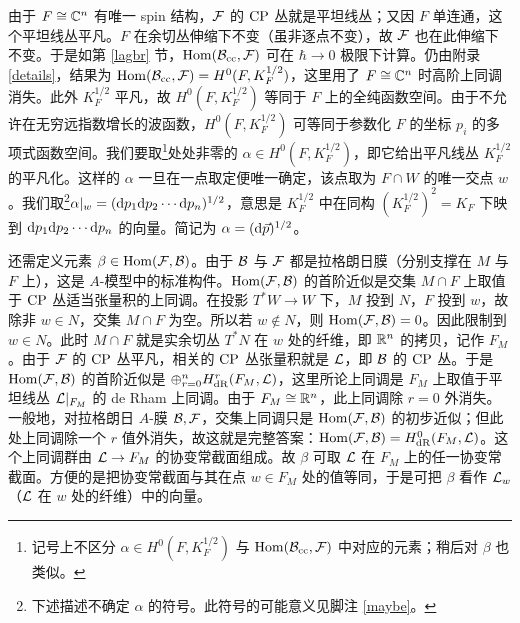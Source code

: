 由于 $F\cong{\mathbb C}^n$ 有唯一 spin 结构，${\mathcal F}$ 的 ${\mathrm{CP}}$ 丛就是平坦线丛；又因 $F$ 单连通，这个平坦线丛平凡。$F$ 在余切丛伸缩下不变（虽非逐点不变），故 ${\mathcal F}$ 也在此伸缩下不变。于是如第 \ref{lagbr} 节，${\mathrm{Hom}}({\mathcal B}_{\mathrm{cc}},{\mathcal F})$ 可在 $\hbar\to0$ 极限下计算。仍由附录 \ref{details}，结果为 ${\mathrm{Hom}}({\mathcal B}_{\mathrm{cc}},{\mathcal F})=H^0(F,K_F^{1/2})$，这里用了 $F\cong{\mathbb C}^n$ 时高阶上同调消失。此外 $K_F^{1/2}$ 平凡，故 $H^0(F,K_F^{1/2})$ 等同于 $F$ 上的全纯函数空间。由于不允许在无穷远指数增长的波函数，$H^0(F,K_F^{1/2})$ 可等同于参数化 $F$ 的坐标 $p_i$ 的多项式函数空间。我们要取\footnote{记号上不区分 $\alpha\in H^0(F,K_F^{1/2})$ 与 ${\mathrm{Hom}}({\mathcal B}_{\mathrm{cc}},{\mathcal F})$ 中对应的元素；稍后对 $\beta$ 也类似。}处处非零的 $\alpha\in H^0(F,K_F^{1/2})$，即它给出平凡线丛 $K_F^{1/2}$ 的平凡化。这样的 $\alpha$ 一旦在一点取定便唯一确定，该点取为 $F\cap W$ 的唯一交点 $w$。我们取\footnote{\label{funnysign}下述描述不确定 $\alpha$ 的符号。此符号的可能意义见脚注 \ref{maybe}。}$\alpha|_w=({\mathrm d} p_1{\mathrm d} p_2\cdots{\mathrm d} p_n)^{1/2}$，意思是 $K_F^{1/2}$ 中在同构 $(K_F^{1/2})^2=K_F$ 下映到 ${\mathrm d} p_1{\mathrm d} p_2\cdots{\mathrm d} p_n$ 的向量。简记为 $\alpha=({\mathrm d}\vec p)^{1/2}$。

还需定义元素 $\beta\in{\mathrm{Hom}}({\mathcal F},{\mathcal B})$。由于 ${\mathcal B}$ 与 ${\mathcal F}$ 都是拉格朗日膜（分别支撑在 $M$ 与 $F$ 上），这是 $A$-模型中的标准构件。${\mathrm{Hom}}({\mathcal F},{\mathcal B})$ 的首阶近似是交集 $M\cap F$ 上取值于 ${\mathrm{CP}}$ 丛适当张量积的上同调。在投影 $T^*W\to W$ 下，$M$ 投到 $N$，$F$ 投到 $w$，故除非 $w\in N$，交集 $M\cap F$ 为空。所以若 $w\notin N$，则 ${\mathrm{Hom}}({\mathcal F},{\mathcal B})=0$。因此限制到 $w\in N$。此时 $M\cap F$ 就是实余切丛 $T^*N$ 在 $w$ 处的纤维，即 ${\mathbb R}^n$ 的拷贝，记作 $F_M$。由于 ${\mathcal F}$ 的 ${\mathrm{CP}}$ 丛平凡，相关的 ${\mathrm{CP}}$ 丛张量积就是 ${\mathcal L}$，即 ${\mathcal B}$ 的 ${\mathrm{CP}}$ 丛。于是 ${\mathrm{Hom}}({\mathcal F},{\mathcal B})$ 的首阶近似是 $\oplus_{r=0}^nH_{\mathrm{dR}}^r(F_M,{\mathcal L})$，这里所论上同调是 $F_M$ 上取值于平坦线丛 ${\mathcal L}|_{F_M}$ 的 de Rham 上同调。由于 $F_M\cong{\mathbb R}^n$，此上同调除 $r=0$ 外消失。一般地，对拉格朗日 $A$-膜 ${\mathcal B},{\mathcal F}$，交集上同调只是 ${\mathrm{Hom}}({\mathcal F},{\mathcal B})$ 的初步近似；但此处上同调除一个 $r$ 值外消失，故这就是完整答案：${\mathrm{Hom}}({\mathcal F},{\mathcal B})=H_{\mathrm{dR}}^0(F_M,{\mathcal L})$。这个上同调群由 ${\mathcal L}\to F_M$ 的协变常截面组成。故 $\beta$ 可取 ${\mathcal L}$ 在 $F_M$ 上的任一协变常截面。方便的是把协变常截面与其在点 $w\in F_M$ 处的值等同，于是可把 $\beta$ 看作 ${\mathcal L}_w$（${\mathcal L}$ 在 $w$ 处的纤维）中的向量。

